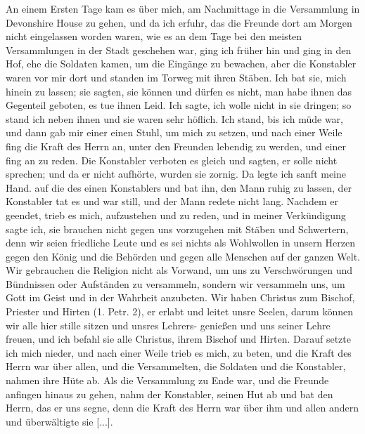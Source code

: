 An einem Ersten Tage kam es über mich, am Nachmittage
in die Versammlung in Devonshire House zu gehen, 
und da ich
erfuhr, das die Freunde dort am Morgen nicht eingelassen worden
waren, wie es an dem Tage bei den meisten Versammlungen in
der Stadt geschehen war, ging ich früher hin und ging in den
Hof, ehe die Soldaten kamen, um die Eingänge zu bewachen,
aber die Konstabler waren vor mir dort und standen im Torweg
mit ihren Stäben. Ich bat 
sie, mich hinein zu lassen; sie sagten,
sie können und dürfen es nicht, man habe ihnen das Gegenteil
geboten, es tue ihnen Leid. Ich sagte, ich wolle nicht in sie
dringen; so stand ich neben ihnen und sie waren sehr höflich.
Ich stand, bis ich müde war, und dann gab mir einer einen
Stuhl, um mich zu setzen, und nach einer Weile fing die Kraft
des Herrn an, unter den Freunden lebendig zu werden, und
einer fing an zu reden. Die Konstabler verboten es gleich und
sagten, er solle nicht sprechen; und da er nicht aufhörte, wurden
sie zornig. Da legte ich sanft meine Hand. auf die des einen 
Konstablers und bat ihn, den Mann ruhig zu lassen, der Konstabler tat
es und war still, und der Mann redete nicht lang. Nachdem er
geendet, trieb es mich, aufzustehen und zu reden, und in meiner
Verkündigung sagte ich, sie brauchen nicht gegen uns vorzugehen
mit Stäben und Schwertern, denn wir seien friedliche Leute und
es sei nichts als Wohlwollen in unsern Herzen gegen den König
und die Behörden und gegen alle Menschen auf der ganzen Welt.
Wir gebrauchen die Religion nicht als Vorwand, um uns zu
Verschwörungen und Bündnissen oder Aufständen 
zu versammeln,
sondern wir versammeln uns, um Gott im Geist und in der
Wahrheit anzubeten. Wir haben Christus zum Bischof, Priester
und Hirten (1. Petr. 2), 
er erlabt und leitet unsre Seelen, darum
können wir alle hier stille sitzen und unsres Lehrers- genießen und
uns seiner Lehre freuen, und ich befahl sie alle Christus, ihrem
Bischof und Hirten. Darauf setzte ich mich nieder, und nach einer
Weile trieb es mich, zu beten, und die Kraft des Herrn war über
allen, und die Versammelten, die Soldaten und die Konstabler,
nahmen ihre Hüte ab. Als die Versammlung zu Ende war, und
die Freunde anfingen hinaus zu gehen, nahm der Konstabler,
seinen Hut ab und bat den Herrn, das er uns segne, denn die
Kraft des Herrn war über ihm und allen andern und überwältigte sie [...].

